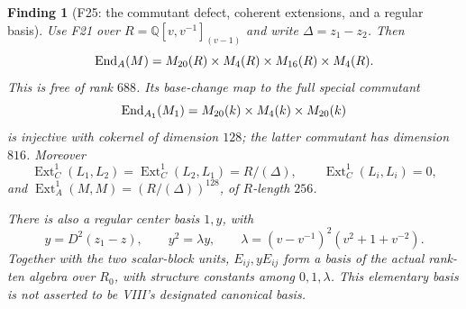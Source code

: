 \documentclass[11pt,a4paper]{article}
\newcommand{\Q}{\mathbb Q}\newcommand{\Z}{\mathbb Z}\newcommand{\C}{\mathbb C}\newcommand{\N}{\mathbb N}\newcommand{\F}{\mathbb F}
\newcommand{\fid}[1]{\textsf{#1}}\newcommand{\gate}[1]{\textsf{#1}}
\theoremstyle{named}\newtheorem{finding}{Finding}[section]
\theoremstyle{definition}\newtheorem{definition}[finding]{Definition}
\theoremstyle{remark}\newtheorem{remark}[finding]{Remark}
\begin{document}
\begin{finding}[\fid{F25}: the commutant defect, coherent extensions, and a regular basis]\label{f:r3deformation}
Use \fid{F21} over $R=\Q[v,v^{-1}]_{(v-1)}$ and write
$\Delta=z_1-z_2$. Then
\[
 \operatorname{End}_A(M)=M_{20}(R)\times M_4(R)\times M_{16}(R)\times M_4(R).
\]
This is free of rank $688$. Its base-change map to the full special
commutant
\[
 \operatorname{End}_{A_1}(M_1)=M_{20}(k)\times M_4(k)\times M_{20}(k)
\]
is injective with cokernel of dimension $128$; the latter commutant has
dimension $816$. Moreover
\[
 \operatorname{Ext}^1_C(L_1,L_2)
 =\operatorname{Ext}^1_C(L_2,L_1)=R/(\Delta),\qquad
 \operatorname{Ext}^1_C(L_i,L_i)=0,
\]
and $\operatorname{Ext}^1_A(M,M)=(R/(\Delta))^{128}$, of $R$-length $256$.

There is also a regular center basis $1,y$, with
\begin{equation}\label{eq:r3basis}
 y=D^2(z_1-z),\qquad
 y^2=\lambda y,\qquad
 \lambda=(v-v^{-1})^2(v^2+1+v^{-2}).
\end{equation}
Together with the two scalar-block units, $E_{ij},yE_{ij}$ form a basis
of the actual rank-ten algebra over $R_0$, with structure constants
among $0,1,\lambda$. This elementary basis is not asserted to be VIII's
designated canonical basis.
\end{finding}
\end{document}
